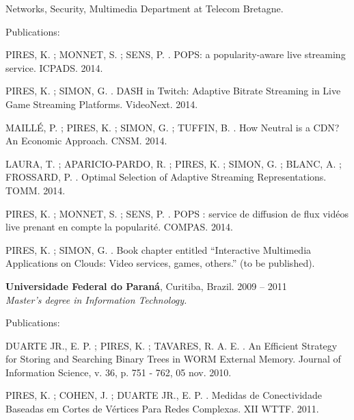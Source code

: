 \documentclass[margin,centered,10pt]{resume}
\begin{document}
\begin{resume}
\begin{list2}
\begin{list3}
        \item Networks, Security, Multimedia Department at Telecom Bretagne.
        \end{list3}
        \item Publications:
        \begin{list3}
        \item PIRES, K. ; MONNET, S. ; SENS, P. . POPS: a popularity-aware live streaming service. ICPADS. 2014.
        \item PIRES, K. ; SIMON, G. . DASH in Twitch: Adaptive Bitrate Streaming in Live Game Streaming Platforms. VideoNext. 2014.
        \item MAILLÉ, P. ; PIRES, K. ; SIMON, G. ; TUFFIN, B. . How Neutral is a CDN? An Economic Approach. CNSM. 2014.
        \item LAURA, T. ; APARICIO-PARDO, R. ; PIRES, K. ; SIMON, G. ; BLANC, A. ; FROSSARD, P. . Optimal Selection of Adaptive Streaming Representations. TOMM. 2014.
        \item PIRES, K. ; MONNET, S. ; SENS, P. . POPS : service de diffusion de flux vidéos live prenant en compte la popularité. COMPAS. 2014.
        \item PIRES, K. ; SIMON, G. . Book chapter entitled “Interactive Multimedia Applications on Clouds: Video services, games, others.” (to be published).
        \end{list3}
    \end{list2}\vspace{-1.5mm}%


    \textbf{Universidade Federal do Paraná}, Curitiba, Brazil.
    \hfill 2009 – 2011
    \\
    \textsl{Master’s degree in Information Technology.}
    \vspace{-3mm}\\\vspace{-1mm}%
    \begin{list2}
        \item Publications:
        \begin{list3}
        \item DUARTE JR., E. P. ; PIRES, K. ; TAVARES, R. A. E. . An Efficient Strategy for Storing and Searching Binary Trees in WORM External Memory. Journal of Information Science, v. 36, p. 751 - 762, 05 nov. 2010.
        \item PIRES, K. ; COHEN, J. ; DUARTE JR., E. P. . Medidas de Conectividade Baseadas em Cortes de Vértices Para Redes Complexas. XII WTTF. 2011.
        \end{list3}
    \end{list2}\vspace{-1.5mm}%


\end{resume}
\end{document}
